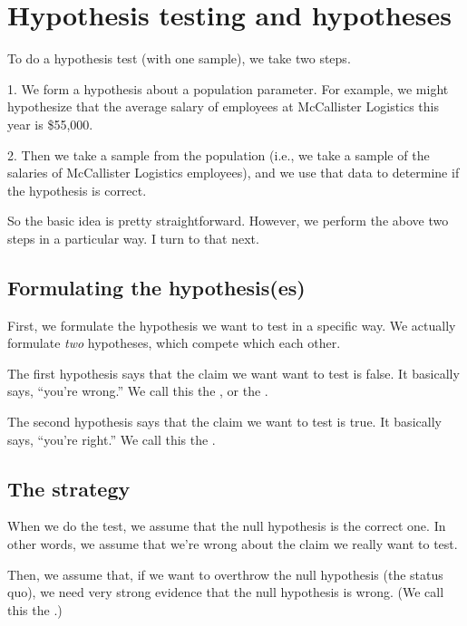 \documentclass[../../../main.tex]{subfiles}
\begin{document}
\chapter{Hypothesis testing and hypotheses}


To do a hypothesis test (with one sample), we take two steps.

  1. We form a hypothesis about a population parameter. For example, we might hypothesize that the average salary of employees at McCallister Logistics this year is \$55,000.

  2. Then we take a sample from the population (i.e., we take a sample of the salaries of McCallister Logistics employees), and we use that data to determine if the hypothesis is correct.

\noindent
So the basic idea is pretty straightforward. However, we perform the above two steps in a particular way. I turn to that next.


\section{Formulating the hypothesis(es)}

First, we formulate the hypothesis we want to test in a specific way. We actually formulate \emph{two} hypotheses, which compete which each other.

The first hypothesis says that the claim we want want to test is false. It basically says, ``you're wrong.'' We call this the , or the .

The second hypothesis says that the claim we want to test is true. It basically says, ``you're right.'' We call this the .


\section{The strategy}

When we do the test, we assume that the null hypothesis is the correct one. In other words, we assume that we're wrong about the claim we really want to test. 

Then, we assume that, if we want to overthrow the null hypothesis (the status quo), we need very strong evidence that the null hypothesis is wrong. (We call this the .)
\end{document}
